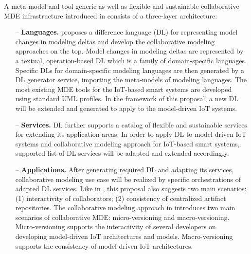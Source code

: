 A meta-model and tool generic as well as flexible and sustainable \cite{jelschen+2016} collaborative MDE infrastructure introduced in \cite{Kuryazov+2018} consists of a three-layer architecture:
\begin{itemize}
\item[--] \textbf{Languages.} \cite{Kuryazov+2018} proposes a difference language (DL) for representing model changes in modeling deltas and develop the collaborative modeling approaches on the top. Model changes in modeling deltas are represented by a textual, operation-based DL which is a family of domain-specific languages. Specific DLs for domain-specific modeling languages are then generated by a DL generator service, importing the meta-models of modeling languages. The most existing MDE tools for the IoT-based smart systems are developed using standard UML profiles. In the framework of this proposal, a new DL will be extended and generated to apply to the model-driven IoT systems.
\item[--] \textbf{Services.} DL further supports a catalog of flexible and sustainable services for extending its application areas. In order to apply DL to model-driven IoT systems and collaborative modeling approach for IoT-based smart systems, supported list of DL services will be adapted and extended accordingly.
\item[--] \textbf{Applications.} After generating required DL and adapting its services, collaborative modeling use case will be realized by specific orchestrations of adapted DL services. Like in \cite{Kuryazov+2018}, this proposal also suggests two main scenarios: (1) interactivity of collaborators; (2) consistency of centralized artifact repositories. The collaborative modeling approach in \cite{Kuryazov+2018} introduces two main scenarios of collaborative MDE: micro-versioning and macro-versioning. Micro-versioning supports the interactivity of several developers on developing model-driven IoT architectures and models. Macro-versioning supports the consistency of model-driven IoT architectures.
\end{itemize}

